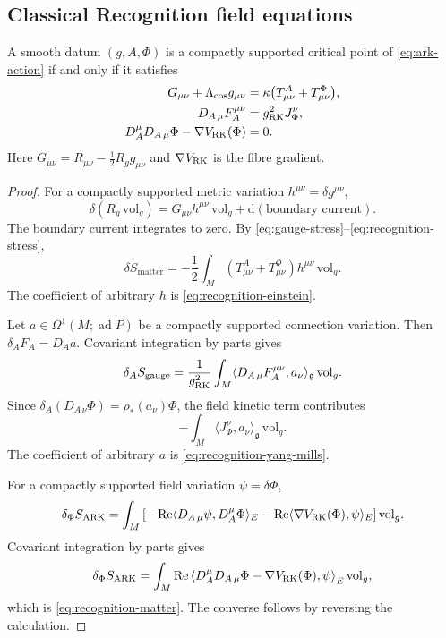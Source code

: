 \subsection{Classical Recognition field equations}

\begin{theorem}
\label{thm:classical-recognition-field-equations}
A smooth datum $(g,A,\Phi)$ is a compactly supported critical point of \eqref{eq:ark-action} if and only if it satisfies
\begin{align}
G_{\mu\nu}+\Lambda_{\mathrm{cos}}g_{\mu\nu}
&=\kappa\bigl(T^A_{\mu\nu}+T^\Phi_{\mu\nu}\bigr),
\label{eq:recognition-einstein}\\
D_{A\,\mu}F_A^{\mu\nu}
&=g_{\mathrm{RK}}^2J_\Phi^\nu,
\label{eq:recognition-yang-mills}\\
D_A^\mu D_{A\,\mu}\Phi
-\nabla V_{\mathrm{RK}}(\Phi)
&=0.
\label{eq:recognition-matter}
\end{align}
Here $G_{\mu\nu}=R_{\mu\nu}-\tfrac12R_gg_{\mu\nu}$ and $\nabla V_{\mathrm{RK}}$ is the fibre gradient.
\end{theorem}

\begin{proof}
For a compactly supported metric variation $h^{\mu\nu}=\delta g^{\mu\nu}$,
\[
\delta(R_g\,\mathrm{vol}_g)
=G_{\mu\nu}h^{\mu\nu}\,\mathrm{vol}_g
+\mathrm d(\text{boundary current}).
\]
The boundary current integrates to zero. By \eqref{eq:gauge-stress}--\eqref{eq:recognition-stress},
\[
\delta S_{\mathrm{matter}}
=-\frac12\int_M
(T^A_{\mu\nu}+T^\Phi_{\mu\nu})h^{\mu\nu}\,\mathrm{vol}_g.
\]
The coefficient of arbitrary $h$ is \eqref{eq:recognition-einstein}.

Let $a\in\Omega^1(M;\operatorname{ad}P)$ be a compactly supported connection variation. Then $\delta_A F_A=D_Aa$. Covariant integration by parts gives
\[
\delta_A S_{\mathrm{gauge}}
=\frac{1}{g_{\mathrm{RK}}^2}
\int_M\langle D_{A\,\mu}F_A^{\mu\nu},a_\nu\rangle_{\mathfrak g}\,\mathrm{vol}_g.
\]
Since $\delta_A(D_{A\,\nu}\Phi)=\rho_*(a_\nu)\Phi$, the field kinetic term contributes
\[
-\int_M\langle J_\Phi^\nu,a_\nu\rangle_{\mathfrak g}\,\mathrm{vol}_g.
\]
The coefficient of arbitrary $a$ is \eqref{eq:recognition-yang-mills}.

For a compactly supported field variation $\psi=\delta\Phi$,
\[
\delta_\Phi S_{\mathrm{ARK}}
=\int_M\left[
-\operatorname{Re}\langle D_{A\,\mu}\psi,D_A^\mu\Phi\rangle_E
-\operatorname{Re}\langle\nabla V_{\mathrm{RK}}(\Phi),\psi\rangle_E
\right]\mathrm{vol}_g.
\]
Covariant integration by parts gives
\[
\delta_\Phi S_{\mathrm{ARK}}
=\int_M\operatorname{Re}\left\langle
D_A^\mu D_{A\,\mu}\Phi-\nabla V_{\mathrm{RK}}(\Phi),\psi
\right\rangle_E\mathrm{vol}_g,
\]
which is \eqref{eq:recognition-matter}. The converse follows by reversing the calculation.
\end{proof}

